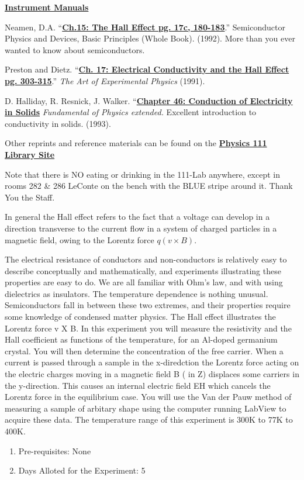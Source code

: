 \documentclass{../lab}
\newcommand{\InstrumentManuals}{http://experimentationlab.berkeley.edu/node/106}
\newcommand{\ChFifteenTheHallEffect}{http://physics111.lib.berkeley.edu/Physics111/Reprints/SHE/09-Semiconductors.pdf}
\newcommand{\ChSeventeenElectricalConductivityandtheHallEffect}{http://physics111.lib.berkeley.edu/Physics111/Reprints/SHE/07-Electrical_Conductivity.pdf}
\newcommand{\ChapterFortySixConductionofElectricity}{http://physics111.lib.berkeley.edu/Physics111/Reprints/SHE/Halliday_Resnick/Ch.\%2046\%20Conduction\%20of\%20electricity\%20in\%20solids.pdf}
\begin{document}
\begin{thebibliography}{}
\label{references}
\href{\InstrumentManuals}{\textbf{Instrument Manuals}}

Neamen, D.A. ``\href{\ChFifteenTheHallEffect}{\textbf{Ch.15: The Hall Effect pg. 17c, 180-183}}.'' Semiconductor Physics and Devices, Basic Principles (Whole Book). (1992). More than you ever wanted to know about semiconductors.

Preston and Dietz. ``\href{\ChSeventeenElectricalConductivityandtheHallEffect}{\textbf{Ch. 17: Electrical Conductivity and the Hall Effect pg. 303-315}}.'' \emph{The Art of Experimental Physics} (1991).

D. Halliday, R. Resnick, J. Walker. ``\href{\ChapterFortySixConductionofElectricity}{\textbf{Chapter 46: Conduction of Electricity in Solids}} \emph{Fundamental of Physics extended.} Excellent introduction to conductivity in solids. (1993).
\end{thebibliography}

\vspace{1em}
\noindent Other reprints and reference materials can be found on the \href{\LabReprints}{\textbf{Physics 111 Library Site}}

Note that there is NO eating or drinking in the 111-Lab anywhere, except in rooms 282 & 286 LeConte on the bench with the BLUE stripe around it. Thank You the Staff.

In general the Hall effect refers to the fact that a voltage can develop in a direction transverse to the current flow in a system of charged particles in a magnetic field, owing to the Lorentz force $q(v \times B)$.

The electrical resistance of conductors and non-conductors is relatively easy to describe conceptually and mathematically, and experiments illustrating these properties are easy to do. We are all familiar with Ohm's law, and with using dielectrics as insulators. The temperature dependence is nothing unusual. Semiconductors fall in between these two extremes, and their properties require some knowledge of condensed matter physics. The Hall effect illustrates the Lorentz force v X B. In this experiment you will measure the resistivity and the Hall coefficient as functions of the temperature, for an Al-doped germanium crystal. You will then determine the concentration of the free carrier. When a current is passed through a sample in the x-diredction the Lorentz force acting on the electric charges moving in a magnetic field B ( in Z) displaces some carriers in the y-direction. This causes an internal electric field EH which cancels the Lorentz force in the equilibrium case. You will use the Van der Pauw method of measuring a sample of arbitary shape using the computer running LabView to acquire these data. The temperature range of this experiment is 300K to 77K to 400K.

\begin{enumerate}
    \item Pre-requisites: None
    \item Days Alloted for the Experiment: 5
\end{enumerate}
\end{document}
